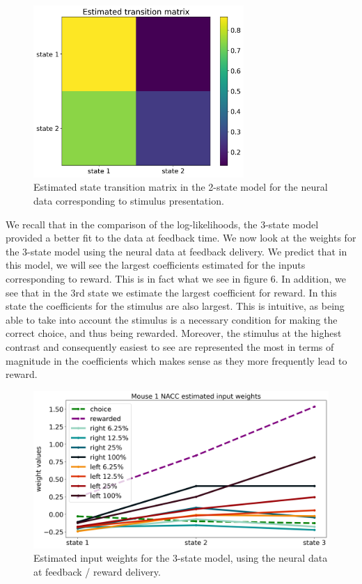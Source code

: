 \documentclass{article}
\begin{document}
\begin{figure}[H]
\centering
 \includegraphics[width=8cm]{stim_images/trans_mat_2state.png}
 \caption{Estimated state transition matrix in the 2-state model for the neural data corresponding to stimulus presentation.}
\end{figure}

We recall that in the comparison of the log-likelihoods, the 3-state model provided a better fit to the data at feedback time. We now look at the weights for the 3-state model using the neural data at feedback delivery. We predict that in this model, we will see the largest coefficients estimated for the inputs corresponding to reward. This is in fact what we see in figure 6. In addition, we see that in the 3rd state we estimate the largest coefficient for reward. In this state the coefficients for the stimulus are also largest. This is intuitive, as being able to take into account the stimulus is a necessary condition for making the correct choice, and thus being rewarded. Moreover, the stimulus at the highest contrast and consequently easiest to see are represented the most in terms of magnitude in the coefficients which makes sense as they more frequently lead to reward. 

\begin{figure}[H]
\centering
 \includegraphics[width=12cm]{feed_images/W_states__feedback_3fip29.png}
 \caption{Estimated input weights for the 3-state model, using the neural data at feedback / reward delivery. }
\end{figure}
\end{document}

